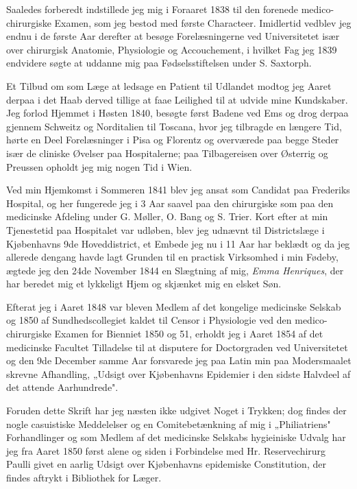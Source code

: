 \documentclass[12pt,a4paper]{article}
\newcommand{\opage}[1]{\marginnote{\footnotesize\textit{[#1]}}}
\begin{document}
Saaledes forberedt indstillede jeg mig i Foraaret 1838 til den forenede
medico-chirurgiske Examen, som jeg bestod med første Characteer. Imidlertid
vedblev jeg endnu i de første Aar derefter at besøge Forelæsningerne ved
Universitetet især over chirurgisk Anatomie, Physiologie og Accouchement, i
hvilket Fag jeg 1839 endvidere søgte at uddanne mig paa Fødselsstiftelsen under
S. Saxtorph.

Et Tilbud om som Læge at ledsage en Patient til Udlandet modtog jeg Aaret derpaa
i det Haab derved tillige at faae Leilighed til at udvide mine Kundskaber. Jeg
forlod Hjemmet i Høsten 1840, besøgte først Badene ved Ems og drog derpaa gjennem
Schweitz og Norditalien til Toscana, hvor jeg tilbragde en længere Tid, hørte en
Deel Forelæsninger i Pisa og Florentz og overværede paa begge Steder især de
cliniske Øvelser paa Hospitalerne; paa Tilbagereisen over Østerrig og Preussen
opholdt jeg mig nogen Tid i Wien.

Ved min Hjemkomst i Sommeren 1841 blev jeg ansat som Candidat paa Frederiks
Hospital, og her fungerede jeg i 3 Aar saavel paa den chirurgiske som paa den
medicinske Afdeling under G. Møller, O. Bang og S. Trier. Kort efter at min
Tjenestetid paa Hospitalet var udløben, blev jeg udnævnt til Districtslæge i
Kjøbenhavns 9de Hoveddistrict, et Embede jeg nu i 11 Aar har beklædt og da jeg
allerede dengang havde lagt Grunden til en practisk Virksomhed i min Fødeby,
ægtede jeg den 24de November 1844 en Slægtning af mig, \emph{Emma Henriques}, der
har beredet mig et lykkeligt Hjem og skjænket mig en elsket Søn.

Efterat jeg i Aaret 1848 var bleven Medlem af det kongelige medicinske Selskab og
1850 af Sundhedscollegiet kaldet til Censor i Physiologie ved
\opage{40} den medico-chirurgiske Examen for Bienniet 1850 og 51, erholdt jeg i Aaret 1854
af det medicinske Facultet Tilladelse til at disputere for Doctorgraden ved
Universitetet og den 9de December samme Aar forsvarede jeg paa Latin min paa
Modersmaalet skrevne Afhandling, „Udsigt over Kjøbenhavns Epidemier i den sidste
Halvdeel af det attende Aarhundrede".

Foruden dette Skrift har jeg næsten ikke udgivet Noget i Trykken; dog findes der
nogle casuistiske Meddelelser og en Comitebetænkning af mig i „Philiatriens"
Forhandlinger og som Medlem af det medicinske Selskabs hygieiniske Udvalg har jeg
fra Aaret 1850 først alene og siden i Forbindelse med Hr. Reservechirurg Paulli
givet en aarlig Udsigt over Kjøbenhavns epidemiske Constitution, der findes
aftrykt i Bibliothek for Læger.
\end{document}
